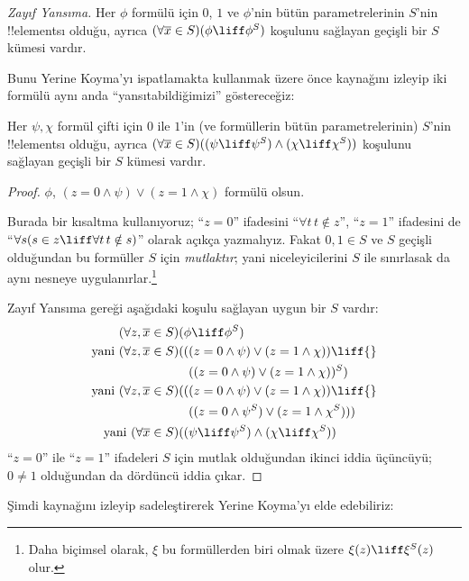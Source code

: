 \documentclass[../../../include/open-logic-section]{subfiles}
\begin{document}
\begin{defish}
\emph{Zayıf Yansıma.} Her $\phi$ formülü için $0$, $1$ ve $\phi$'nin bütün
parametrelerinin $S$'nin !!{element}s{}ı olduğu, ayrıca $(\forall \overline{x}
\in S)(\phi \liff \phi^S)$ koşulunu sağlayan geçişli bir $S$ kümesi vardır.
\end{defish}

Bunu Yerine Koyma'yı ispatlamakta kullanmak üzere önce \citet[Theorem 2'nin
ilk kısmı]{Levy1960} kaynağını izleyip iki formülü aynı anda
``yansıtabildiğimizi'' göstereceğiz:

\begin{lem}
Her $\psi, \chi$ formül çifti için $0$ ile $1$'in (ve formüllerin bütün
parametrelerinin) $S$'nin !!{element}s{}ı olduğu, ayrıca $(\forall \overline{x}
\in S)((\psi \liff \psi^S) \land (\chi \liff \chi^S))$ koşulunu sağlayan
geçişli bir $S$ kümesi vardır.
\end{lem}

\begin{proof}
$\phi$, $(z = 0 \land \psi) \lor (z = 1 \land \chi)$ formülü olsun.

Burada bir kısaltma kullanıyoruz; ``$z = 0$'' ifadesini ``$\forall t\, t
\notin z$'', ``$z =1$'' ifadesini de ``$\forall s(s \in z \liff \forall
t\, t \notin s)$'' olarak açıkça yazmalıyız. Fakat $0, 1 \in S$ ve $S$
geçişli olduğundan bu formüller $S$ için \emph{mutlaktır}; yani
niceleyicilerini $S$ ile sınırlasak da aynı nesneye uygulanırlar.\footnote{Daha
biçimsel olarak, $\xi$ bu formüllerden biri olmak üzere $\xi(z) \liff
\xi^S(z)$ olur.}

Zayıf Yansıma gereği aşağıdaki koşulu sağlayan uygun bir $S$ vardır:
\begin{align*}
	(\forall z, \overline{x} \in S)(&\phi \liff \phi^S)\\
	\text{yani }(\forall z, \overline{x} \in S)(&((z = 0 \land \psi) \lor (z = 1 \land \chi)) \liff {}\\
	&\phantom{(}((z = 0 \land \psi) \lor (z = 1 \land \chi))^S)\\
	\text{yani }(\forall z, \overline{x} \in S)(&((z = 0 \land \psi) \lor (z = 1 \land \chi))\liff {}\\
	&\phantom{(}((z = 0 \land \psi^S) \lor (z = 1 \land \chi^S)))\\
	\text{yani }(\forall \overline{x} \in S)(&(\psi \liff \psi^S) \land (\chi \liff \chi^S))
\end{align*}
``$z = 0$'' ile ``$z=1$'' ifadeleri $S$ için mutlak olduğundan ikinci iddia
üçüncüyü; $0 \neq 1$ olduğundan da dördüncü iddia çıkar.
\end{proof}\noindent
Şimdi \citet[Theorem 6]{Levy1960} kaynağını izleyip sadeleştirerek Yerine
Koyma'yı elde edebiliriz:
\end{document}

